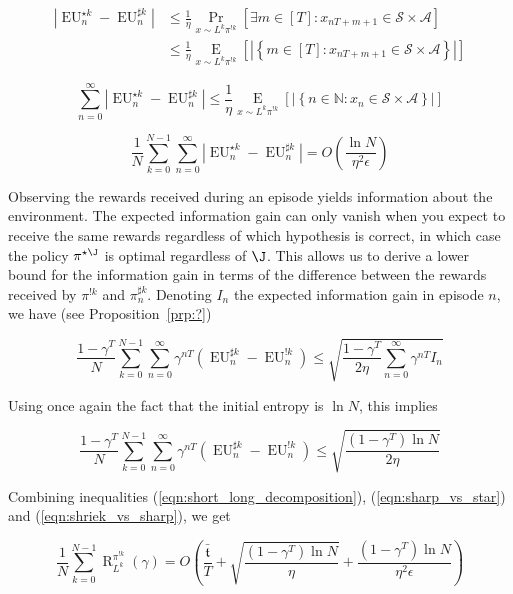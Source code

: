 \documentclass[anon,12pt]{colt2018} %
\newcommand{\AP}[1]{\left(#1\right)}
\newcommand{\AB}[1]{\left[#1\right]}
\newcommand{\AC}[1]{\left\{#1\right\}}
\newcommand{\Pa}[2]{\underset{#1}{\operatorname{Pr}}\AB{#2}}
\newcommand{\Ea}[2]{\underset{#1}{\operatorname{E}}\AB{#2}}
\newcommand{\Nats}{\mathbb{N}}
\newcommand{\Abs}[1]{\left\vert #1 \right\vert}
\newcommand{\A}{\mathcal{A}}
\newcommand{\St}{\mathcal{S}}
\newcommand{\EU}{\operatorname{EU}}
\newcommand{\Rg}{\operatorname{R}}
\newcommand{\Tn}{\mathfrak{t}}
\newcommand{\IP}{\pi^{!k}}
\begin{document}
\begin{align*}
\Abs{\EU^{\star k}_n-\EU^{\sharp k}_n} &\leq \frac{1}{\eta}\Pa{x\sim L^k\pi^{!k}}{\exists m \in [T]: x_{nT+m+1}\in\St \times \A} \\ 
&\leq \frac{1}{\eta}\Ea{x\sim L^k\pi^{!k}}{\Abs{\AC{m \in [T]: x_{nT+m+1}\in\St \times \A}}}
\end{align*}

\[\sum_{n=0}^\infty {\Abs{\EU^{\star k}_n-\EU^{\sharp k}_n}} \leq \frac{1}{\eta}\Ea{x\sim L^k\pi^{!k}}{\Abs{\AC{n \in \Nats: x_n\in\St \times \A}}}\]

\begin{equation}
\label{eqn:sharp_vs_star}
\frac{1}{N}\sum_{k=0}^{N-1}\sum_{n=0}^\infty {\Abs{\EU^{\star k}_n-\EU^{\sharp k}_n}} = O\AP{\frac{\ln{N}}{\eta^2\epsilon}}
\end{equation}

Observing the rewards received during an episode yields information about the environment. The expected information gain can only vanish when you expect to receive the same rewards regardless of which hypothesis is correct, in which case the policy $\pi^{\star\J}$ is optimal regardless of $\J$. This allows us to derive a lower bound for the information gain in terms of the difference between the rewards received by $\pi^{!k}$ and $\pi^{\sharp k}_n$. Denoting $I_n$ the expected information gain in episode $n$, we have (see Proposition~\ref{prp:?})

\begin{equation}
\frac{1-\gamma^T}{N}\sum_{k=0}^{N-1}\sum_{n=0}^\infty \gamma^{nT}\AP{\EU^{\sharp k}_n-\EU^{!k}_n} \leq \sqrt{\frac{1-\gamma^T}{2\eta}\sum_{n=0}^\infty \gamma^{nT}I_n}
\end{equation}

Using once again the fact that the initial entropy is $\ln{N}$, this implies

\begin{equation}
\label{eqn:shriek_vs_sharp}
\frac{1-\gamma^T}{N}\sum_{k=0}^{N-1}\sum_{n=0}^\infty \gamma^{nT}\AP{\EU^{\sharp k}_n-\EU^{!k}_n} \leq \sqrt{\frac{\AP{1-\gamma^T}\ln{N}}{2\eta}}
\end{equation}

Combining inequalities (\ref{eqn:short_long_decomposition}), (\ref{eqn:sharp_vs_star}) and (\ref{eqn:shriek_vs_sharp}), we get

\begin{equation}
\frac{1}{N}\sum_{k=0}^{N-1}\Rg_{L^k}^{\IP}(\gamma) = O\AP{\frac{\bar{\Tn}}{T}+\sqrt{\frac{\AP{1-\gamma^T}\ln{N}}{\eta}}+\frac{\AP{1-\gamma^T}\ln{N}}{\eta^2\epsilon}}
\end{equation}
\end{document}
